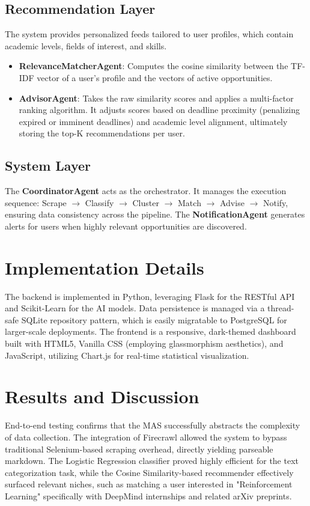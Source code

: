 \documentclass[conference]{IEEEtran}
\begin{document}
\subsection{Recommendation Layer}
The system provides personalized feeds tailored to user profiles, which contain academic levels, fields of interest, and skills.
\begin{itemize}
    \item \textbf{RelevanceMatcherAgent}: Computes the cosine similarity between the TF-IDF vector of a user's profile and the vectors of active opportunities.
    \item \textbf{AdvisorAgent}: Takes the raw similarity scores and applies a multi-factor ranking algorithm. It adjusts scores based on deadline proximity (penalizing expired or imminent deadlines) and academic level alignment, ultimately storing the top-K recommendations per user.
\end{itemize}

\subsection{System Layer}
The \textbf{CoordinatorAgent} acts as the orchestrator. It manages the execution sequence: Scrape $\rightarrow$ Classify $\rightarrow$ Cluster $\rightarrow$ Match $\rightarrow$ Advise $\rightarrow$ Notify, ensuring data consistency across the pipeline. The \textbf{NotificationAgent} generates alerts for users when highly relevant opportunities are discovered.

\section{Implementation Details}
The backend is implemented in Python, leveraging Flask for the RESTful API and Scikit-Learn for the AI models. Data persistence is managed via a thread-safe SQLite repository pattern, which is easily migratable to PostgreSQL for larger-scale deployments. The frontend is a responsive, dark-themed dashboard built with HTML5, Vanilla CSS (employing glassmorphism aesthetics), and JavaScript, utilizing Chart.js for real-time statistical visualization. 

\section{Results and Discussion}
End-to-end testing confirms that the MAS successfully abstracts the complexity of data collection. The integration of Firecrawl allowed the system to bypass traditional Selenium-based scraping overhead, directly yielding parseable markdown. The Logistic Regression classifier proved highly efficient for the text categorization task, while the Cosine Similarity-based recommender effectively surfaced relevant niches, such as matching a user interested in "Reinforcement Learning" specifically with DeepMind internships and related arXiv preprints.
\end{document}
